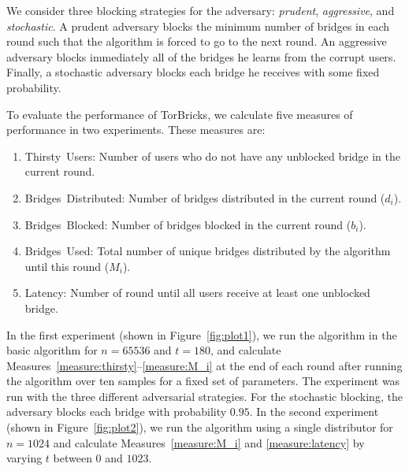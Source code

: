 \documentclass{sig-alternate-05-2015}
\newcommand{\bricks}{}
\def\bricks/{\mbox{TorBricks}}
\newcommand{\sfsize}{\fontsize{0.8\baselineskip}{0.68\baselineskip}\selectfont}
\newcommand{\sans}[1]{\textsf{\sfsize \mbox{#1}}}
\begin{document}
We consider three blocking strategies for the adversary: \emph{prudent}, \emph{aggressive}, and \emph{stochastic}. A prudent adversary blocks the minimum number of bridges in each round such that the algorithm is forced to go to the next round. An aggressive adversary blocks immediately all of the bridges he learns from the corrupt users. Finally, a stochastic adversary blocks each bridge he receives with some fixed probability.

To evaluate the performance of \bricks/, we calculate five measures of performance in two experiments. These measures are:

\begin{enumerate}[itemsep=0.4em, topsep=0.55em]
	\item \sans{Thirsty Users:} Number of users who do not have any unblocked bridge in the current round. \label{measure:thirsty}
	\item \sans{Bridges Distributed:} Number of bridges distributed in the current round ($d_i$). \label{measure:d_i}
	\item \sans{Bridges Blocked:} Number of bridges blocked in the current round ($b_i$). \label{measure:b_i}
	\item \sans{Bridges Used:} Total number of unique bridges distributed by the algorithm until this round ($M_i$). \label{measure:M_i}
	\item \sans{Latency:} Number of round until all users receive at least one unblocked bridge. \label{measure:latency}
\end{enumerate}

In the first experiment (shown in Figure~\ref{fig:plot1}), we run the algorithm in the basic algorithm for ${n=65536}$ and ${t=180}$, and calculate Measures~\ref{measure:thirsty}--\ref{measure:M_i} at the end of each round after running the algorithm over ten samples for a fixed set of parameters. The experiment was run with the three different adversarial strategies. For the stochastic blocking, the adversary blocks each bridge with probability $0.95$. %
In the second experiment (shown in Figure~\ref{fig:plot2}), we run the algorithm using a single distributor for ${n=1024}$ and calculate Measures~\ref{measure:M_i} and \ref{measure:latency} by varying $t$ between $0$ and $1023$.
\end{document}
